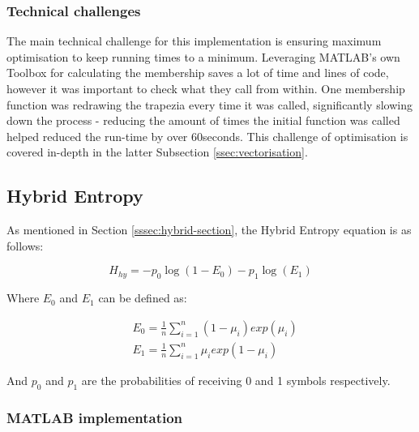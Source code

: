 \subsubsection{Technical challenges}

The main technical challenge for this implementation is ensuring maximum optimisation to keep running times to a minimum. Leveraging MATLAB's own Toolbox for calculating the membership saves a lot of time and lines of code, however it was important to check what they call from within. One membership function was redrawing the trapezia every time it was called, significantly slowing down the process - reducing the amount of times the initial function was called helped reduced the run-time by over 60seconds. This challenge of optimisation is covered in-depth in the latter Subsection \ref{ssec:vectorisation}.

\newpage
\subsection{Hybrid Entropy}
\label{ssec:hybrid-sec}

As mentioned in Section \ref{sssec:hybrid-section}, the Hybrid Entropy equation is as follows:

\begin{equation}
  H_{hy} = -p_0\log(1 - E_0) - p_1\log(E_1)
\end{equation}

Where $E_0$ and $E_1$ can be defined as:

\begin{subequations} %
  \begin{align}
    &E_0 = \frac{1}{n}\displaystyle\sum_{i=1}^{n}{(1-\mu_i)exp(\mu_i)} \\
    &E_1 = \frac{1}{n}\displaystyle\sum_{i=1}^{n}{\mu_iexp(1-\mu_i)}
  \end{align}
\end{subequations}

And $p_0$ and $p_1$ are the probabilities of receiving 0 and 1 symbols respectively.

\subsubsection{MATLAB implementation}

